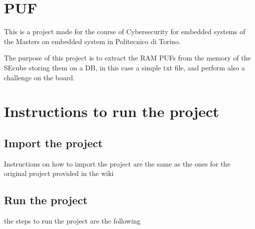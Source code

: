 \section {PUF}
This is a project made for the course of Cybersecurity for embedded systems of the Masters on embedded system in Politecnico di Torino.

The purpose of this project is to extract the RAM PUFs from the memory of the SEcube storing them on a DB, in this case a simple txt file, and perform also a challenge on the board.

\section {Instructions to run the project}

\subsection {Import the project}
Instructions on how to import the project are the same as the ones for the original project provided in the wiki

\subsection {Run the project}
the steps to run the project are the following


